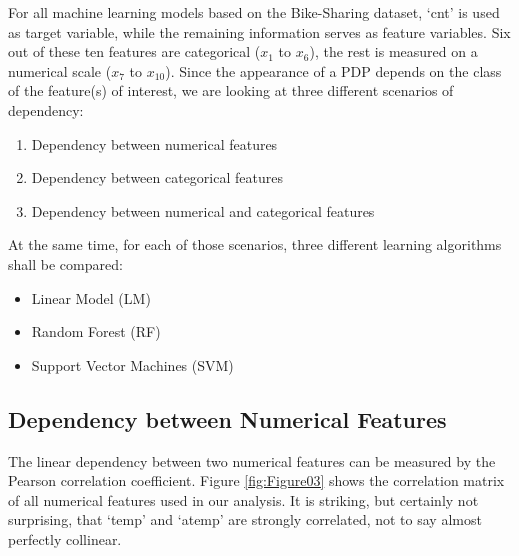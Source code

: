 \documentclass[
]{krantz}
\providecommand{\tightlist}{%
  \setlength{\itemsep}{0pt}\setlength{\parskip}{0pt}}
\begin{document}
For all machine learning models based on the Bike-Sharing dataset, `cnt' is used as target variable, while the remaining information serves as feature variables. Six out of these ten features are categorical (\(x_1\) to \(x_6\)), the rest is measured on a numerical scale (\(x_7\) to \(x_{10}\)). Since the appearance of a PDP depends on the class of the feature(s) of interest, we are looking at three different scenarios of dependency:

\begin{enumerate}
\def\labelenumi{\arabic{enumi}.}
\tightlist
\item
  Dependency between numerical features
\item
  Dependency between categorical features
\item
  Dependency between numerical and categorical features
\end{enumerate}

At the same time, for each of those scenarios, three different learning algorithms shall be compared:

\begin{itemize}
\tightlist
\item
  Linear Model (LM)
\item
  Random Forest (RF)
\item
  Support Vector Machines (SVM)
\end{itemize}

\hypertarget{dependency-between-numerical-features}{%
\subsection{Dependency between Numerical Features}\label{dependency-between-numerical-features}}

The linear dependency between two numerical features can be measured by the Pearson correlation coefficient.\citep{fahrmeir2016statistik} Figure \ref{fig:Figure03} shows the correlation matrix of all numerical features used in our analysis. It is striking, but certainly not surprising, that `temp' and `atemp' are strongly correlated, not to say almost perfectly collinear.
\end{document}
